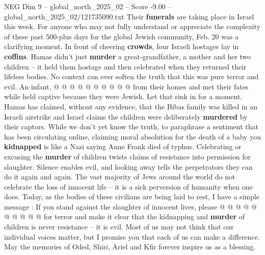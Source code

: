 \begin{textsample}{NEG Dim 9 – global\_north\_2025\_02 – Score -9.00 – global\_north\_2025\_02/121735090.txt}
Their \textbf{funerals} are taking place in Israel this week.
For anyone who may not fully understand or appreciate the complexity of these past 500-plus days for the global Jewish community, Feb. 20 was a clarifying moment.
In front of cheering \textbf{crowds}, four Israeli hostages lay in \textbf{coffins}.
Hamas didn't just \textbf{murder} a great-grandfather, a mother and her two children -- it held them hostage and then celebrated when they returned their lifeless bodies.
No context can ever soften the truth that this was pure terror and evil.
An infant, @ @ @ @ @ @ @ @ @ @ from their homes and met their fates while held captive because they were Jewish.
Let that sink in for a moment.
Hamas has claimed, without any evidence, that the Bibas family was killed in an Israeli airstrike and Israel claims the children were deliberately \textbf{murdered} by their captors.
While we don't yet know the truth, to paraphrase a sentiment that has been circulating online, claiming moral absolution for the death of a baby you \textbf{kidnapped} is like a Nazi saying Anne Frank died of typhus.
Celebrating or excusing the \textbf{murder} of children twists claims of resistance into permission for slaughter.
Silence enables evil, and looking away tells the perpetrators they can do it again and again.
The vast majority of Jews around the world do not celebrate the loss of innocent life -- it is a sick perversion of humanity when one does.
Today, as the bodies of these civilians are being laid to rest, I have a simple message : If you stand against the slaughter of innocent lives, please @ @ @ @ @ @ @ @ @ @ for terror and make it clear that the kidnapping and \textbf{murder} of children is never resistance -- it is evil.
Most of us may not think that our individual voices matter, but I promise you that each of us can make a difference.
May the memories of Oded, Shiri, Ariel and Kfir forever inspire us as a blessing.

\end{textsample}
